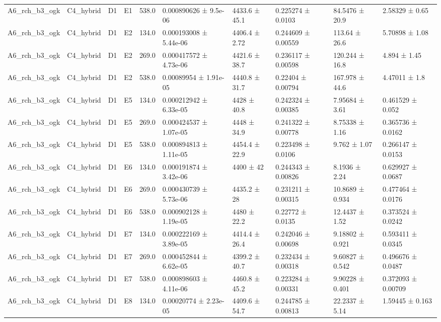 \begin{table}
\begin{tabular}{llllllllll}
A6\_rch\_b3\_ogk & C4\_hybrid & D1 & E1 & 538.0 & 0.000890626 ± 9.5e-06 & 4433.6 ± 45.1 & 0.225274 ± 0.0103 & 84.5476 ± 20.9 & 2.58329 ± 0.65 \\
A6\_rch\_b3\_ogk & C4\_hybrid & D1 & E2 & 134.0 & 0.000193008 ± 5.44e-06 & 4406.4 ± 2.72 & 0.244609 ± 0.00559 & 113.64 ± 26.6 & 5.70898 ± 1.08 \\
A6\_rch\_b3\_ogk & C4\_hybrid & D1 & E2 & 269.0 & 0.000417572 ± 4.73e-06 & 4421.6 ± 38.7 & 0.236117 ± 0.00598 & 120.244 ± 16.8 & 4.894 ± 1.45 \\
A6\_rch\_b3\_ogk & C4\_hybrid & D1 & E2 & 538.0 & 0.00089954 ± 1.91e-05 & 4440.8 ± 31.7 & 0.22404 ± 0.00794 & 167.978 ± 44.6 & 4.47011 ± 1.8 \\
A6\_rch\_b3\_ogk & C4\_hybrid & D1 & E5 & 134.0 & 0.000212942 ± 6.33e-05 & 4428 ± 40.8 & 0.242324 ± 0.00385 & 7.95684 ± 3.61 & 0.461529 ± 0.052 \\
A6\_rch\_b3\_ogk & C4\_hybrid & D1 & E5 & 269.0 & 0.000424537 ± 1.07e-05 & 4448 ± 34.9 & 0.241322 ± 0.00778 & 8.75338 ± 1.16 & 0.365736 ± 0.0162 \\
A6\_rch\_b3\_ogk & C4\_hybrid & D1 & E5 & 538.0 & 0.000894813 ± 1.11e-05 & 4454.4 ± 22.9 & 0.223498 ± 0.0106 & 9.762 ± 1.07 & 0.266147 ± 0.0153 \\
A6\_rch\_b3\_ogk & C4\_hybrid & D1 & E6 & 134.0 & 0.000191874 ± 3.42e-06 & 4400 ± 42 & 0.244343 ± 0.00826 & 8.1936 ± 2.24 & 0.629927 ± 0.0687 \\
A6\_rch\_b3\_ogk & C4\_hybrid & D1 & E6 & 269.0 & 0.000430739 ± 5.73e-06 & 4435.2 ± 28 & 0.231211 ± 0.00315 & 10.8689 ± 0.934 & 0.477464 ± 0.0176 \\
A6\_rch\_b3\_ogk & C4\_hybrid & D1 & E6 & 538.0 & 0.000902128 ± 1.19e-05 & 4480 ± 22.2 & 0.22772 ± 0.0135 & 12.4437 ± 1.52 & 0.373524 ± 0.0242 \\
A6\_rch\_b3\_ogk & C4\_hybrid & D1 & E7 & 134.0 & 0.000222169 ± 3.89e-05 & 4414.4 ± 26.4 & 0.242046 ± 0.00698 & 9.18802 ± 0.921 & 0.593411 ± 0.0345 \\
A6\_rch\_b3\_ogk & C4\_hybrid & D1 & E7 & 269.0 & 0.000452844 ± 6.62e-05 & 4399.2 ± 40.7 & 0.232434 ± 0.00318 & 9.60827 ± 0.542 & 0.496676 ± 0.0487 \\
A6\_rch\_b3\_ogk & C4\_hybrid & D1 & E7 & 538.0 & 0.000898603 ± 4.11e-06 & 4460.8 ± 45.2 & 0.223284 ± 0.00331 & 9.90228 ± 0.401 & 0.372093 ± 0.00709 \\
A6\_rch\_b3\_ogk & C4\_hybrid & D1 & E8 & 134.0 & 0.00020774 ± 2.23e-05 & 4409.6 ± 54.7 & 0.244785 ± 0.00813 & 22.2337 ± 5.14 & 1.59445 ± 0.163 \\

\end{tabular}
\end{table}
